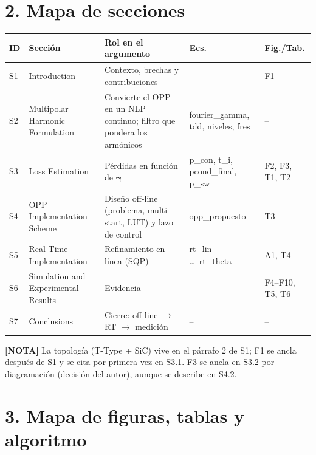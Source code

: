 \documentclass[11pt,a4paper]{article}
\newcommand{\nota}[1]{{\color{Note}\textbf{[NOTA]} #1}}
\newcommand{\gv}{\boldsymbol{\gamma}}
\begin{document}
\section*{2. Mapa de secciones}

{\small
\noindent\begin{tabularx}{\textwidth}{@{}lP{3.7cm}XP{3.6cm}P{1.9cm}@{}}
\toprule
\textbf{ID} & \textbf{Sección} & \textbf{Rol en el argumento} & \textbf{Ecs.} & \textbf{Fig./Tab.}\\
\midrule
S1 & Introduction                      & Contexto, brechas y contribuciones & -- & F1\\
S2 & Multipolar Harmonic Formulation   & Convierte el OPP en un NLP continuo; filtro que pondera los armónicos & fourier\_gamma, tdd, niveles, fres & --\\
S3 & Loss Estimation                   & Pérdidas en función de $\gv$ & p\_con, t\_i, pcond\_final, p\_sw & F2, F3, T1, T2\\
S4 & OPP Implementation Scheme         & Diseño off-line (problema, multi-start, LUT) y lazo de control & opp\_propuesto & T3\\
S5 & Real-Time Implementation          & Refinamiento en línea (SQP) & rt\_lin \dots\ rt\_theta & A1, T4\\
S6 & Simulation and Experimental Results & Evidencia & -- & F4--F10, T5, T6\\
S7 & Conclusions                       & Cierre: off-line $\rightarrow$ RT $\rightarrow$ medición & -- & --\\
\bottomrule
\end{tabularx}}

\vspace{1mm}
\nota{La topología (T-Type + SiC) vive en el párrafo 2 de S1; F1 se ancla
después de S1 y se cita por primera vez en S3.1. F3 se ancla en S3.2 por
diagramación (decisión del autor), aunque se describe en S4.2.}

\section*{3. Mapa de figuras, tablas y algoritmo}
\end{document}
